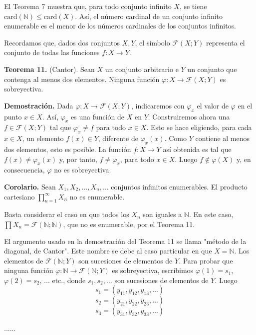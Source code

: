 \documentclass[12pt,oneside]{book}
\begin{document}
El Teorema 7 muestra que, para todo conjunto infinito \( X \), se tiene \( \text{card}(\mathbb{N}) \leq \text{card}(X) \). Así, el número cardinal de un conjunto infinito enumerable es el menor de los números cardinales de los conjuntos infinitos.

Recordamos que, dados dos conjuntos \( X, Y \), el símbolo \( \mathcal{F}(X; Y) \) representa el conjunto de todas las funciones \( f: X \to Y \).

\textbf{Teorema 11.} (Cantor). Sean \( X \) un conjunto arbitrario e \( Y \) un conjunto que contenga al menos dos elementos. Ninguna función \( \varphi: X \to \mathcal{F}(X; Y) \) es sobreyectiva.

\textbf{Demostración.} Dada \( \varphi: X \to \mathcal{F}(X; Y) \), indicaremos con \( \varphi_x \) el valor de \( \varphi \) en el punto \( x \in X \). Así, \( \varphi_x \) es una función de \( X \) en \( Y \). Construiremos ahora una \( f \in \mathcal{F}(X; Y) \) tal que \( \varphi_x \neq f \) para todo \( x \in X \). Esto se hace eligiendo, para cada \( x \in X \), un elemento \( f(x) \in Y \), diferente de \( \varphi_x(x) \). Como \( Y \) contiene al menos dos elementos, esto es posible. La función \( f: X \to Y \) así obtenida es tal que \( f(x) \neq \varphi_x(x) \) y, por tanto, \( f \neq \varphi_x \), para todo \( x \in X \). Luego \( f \notin \varphi(X) \) y, en consecuencia, \( \varphi \) no es sobreyectiva.

\textbf{Corolario.} Sean \( X_1, X_2, \ldots, X_n, \ldots \) conjuntos infinitos enumerables. El producto cartesiano \( \prod_{n=1}^{\infty} X_n \) no es enumerable.

Basta considerar el caso en que todos los \( X_n \) son iguales a \( \mathbb{N} \). En este caso, \( \prod X_n = \mathcal{F}(\mathbb{N}; \mathbb{N}) \), que no es enumerable, por el Teorema 11.

El argumento usado en la demostración del Teorema 11 se llama "método de la diagonal, de Cantor". Este nombre se debe al caso particular en que \( X = \mathbb{N} \). Los elementos de \( \mathcal{F}(\mathbb{N}; Y) \) son sucesiones de elementos de \( Y \). Para probar que ninguna función \( \varphi : \mathbb{N} \to \mathcal{F}(\mathbb{N}; Y) \) es sobreyectiva, escribimos \( \varphi(1) = s_1 \), \( \varphi(2) = s_2 \), ... etc., donde \( s_1, s_2, \ldots \) son sucesiones de elementos de \( Y \). Luego
\[
s_1 = (y_{11}, y_{12}, y_{13}, \ldots)
\]
\[
s_2 = (y_{21}, y_{22}, y_{23}, \ldots)
\]
\[
s_3 = (y_{31}, y_{32}, y_{33}, \ldots)
\]
\begin{center}
    ......
\end{center}
\end{document}
